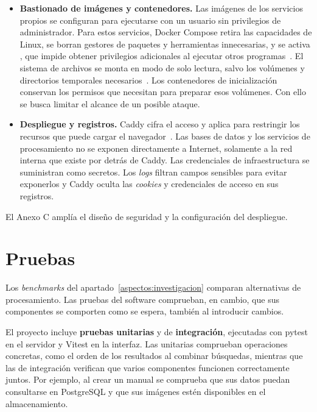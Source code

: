 \begin{itemize}
    \item \textbf{Bastionado de imágenes y contenedores.} Las imágenes de
    los servicios propios se configuran para ejecutarse con un usuario sin
    privilegios de administrador. Para estos servicios, Docker Compose
    retira las capacidades de Linux, se borran gestores de paquetes
    y herramientas innecesarias, y se activa , que
    impide obtener privilegios adicionales al ejecutar otros
    programas~\cite{docker_container_run_seguridad}. El sistema de archivos
    se monta en modo de solo lectura, salvo los volúmenes y directorios
    temporales necesarios~\cite{docker_compose_servicios}. Los contenedores
    de inicialización conservan los permisos que necesitan para preparar
    esos volúmenes. Con ello se busca limitar el alcance de un posible ataque.

    \item \textbf{Despliegue y registros.} Caddy cifra el acceso y aplica
     para restringir los recursos que puede
    cargar el navegador~\cite{owasp_csp}. Las bases de datos y los servicios
    de procesamiento no se exponen directamente a Internet, solamente a la
    red interna que existe por detrás de Caddy. Las
    credenciales de infraestructura se suministran como secretos. Los
    \textit{logs} filtran campos sensibles para evitar exponerlos y Caddy oculta las
    \textit{cookies} y credenciales de acceso en sus registros.
\end{itemize}

El Anexo C amplía el diseño de seguridad y la configuración del despliegue.

\section{Pruebas}
\label{aspectos:pruebas}

Los \textit{benchmarks} del apartado~\ref{aspectos:investigacion} comparan
alternativas de procesamiento. Las pruebas del software comprueban, en cambio,
que sus componentes se comporten como se espera, también al introducir cambios.

El proyecto incluye\textbf{ pruebas unitarias} y de \textbf{integración}, ejecutadas con
pytest en el servidor y Vitest en la interfaz. Las unitarias comprueban
operaciones concretas, como el orden de los resultados al combinar
búsquedas, mientras que las de integración verifican que varios componentes
funcionen correctamente juntos. Por ejemplo, al crear un manual se
comprueba que sus datos puedan consultarse en PostgreSQL y que sus imágenes
estén disponibles en el almacenamiento.

